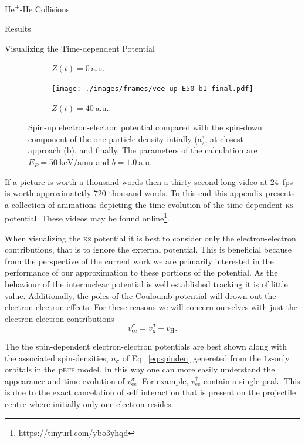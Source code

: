 \documentclass[letterpaper, 11 pt]{report}
\begin{document}
\begin{chapter}{\texorpdfstring{He\textsuperscript{+}}{He+}-He Collisions \label{chap:hephe}}
\begin{section}{Results \label{sec:hephe-disc}}
\begin{subsection}{Visualizing the Time-dependent Potential \label{sec:visual}}
\begin{figure}[t]
\begin{subfigure}{.49\textwidth}
               \caption{$Z(t) = 0~\mathrm{a.u.}$. \label{fig:upC}}
            \end{subfigure}
            \begin{subfigure}{.49\textwidth}
               \centering
               \texttt{[image: ./images/frames/vee-up-E50-b1-final.pdf]}
               \caption{$Z(t) = 40~\mathrm{a.u.}$. \label{fig:upF}}
            \end{subfigure}
            \caption[Spin-up electron-electron potential]
                    {Spin-up electron-electron potential compared with the spin-down component of the
                    one-particle density intially (a), at closest approach (b), and finally.
                    The parameters of the calculation are $E_P = 50~\mathrm{keV/amu}$ and
                    $b = 1.0~\mathrm{a.u.}$ \label{fig:upPlots}}
         \end{figure}

         If a picture is worth a thousand words then a thirty second long video at 24~fps is worth
         approximatetly 720 thousand words. To this end this appendix presents a collection of animations
         depicting the time evolution of the time-dependent \textsc{ks} potential. These videos may be
         found online\footnote{\url{https://tinyurl.com/ybo3yhqd}}.

         When visualizing the \textsc{ks} potential it is best to consider only the electron-electron
         contributions, that is to ignore the external potential. This is beneficial because from the
         perspective of the current work we are primarily interested in the performance of our
         approximation to these portions of the potential. As the behaviour of the internuclear potential
         is well established tracking it is of little value. Additionally, the poles of the Couloumb
         potential will drown out the electron electron effects. For these reasons we will concern
         ourselves with just the electron-electron contributions
         \begin{equation}
            v_\mathrm{ee}^\sigma = v_\mathrm{x}^\sigma + v_\mathrm{H}.
         \end{equation}

         The the spin-dependent electron-electron potentials are best shown along with the associated
         spin-densities, $n_\sigma$ of Eq.~\eqref{eq:spinden} genereted from the $1s$-only orbitals in
         the p\textsc{etf} model. In this way one can more easily understand the appearance and time
         evolution of $v_\mathrm{ee}^\sigma$. For example, $v_\mathrm{ee}^\uparrow$ contain a single
         peak. This is due to the exact cancelation of self interaction that is present on the
         projectile centre where initially only one electron resides.


\end{subsection}
\end{section}
\end{chapter}
\end{document}
